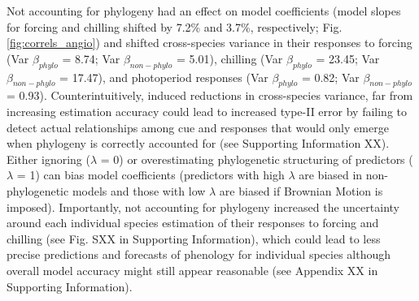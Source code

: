 \documentclass{article}\usepackage[]{graphicx}\usepackage[]{color}
\begin{document}
Not accounting for phylogeny had an effect on model coefficients (model slopes for forcing and chilling shifted by 7.2\% and 3.7\%, respectively; Fig. \ref{fig:correls_angio}) and shifted cross-species variance in their responses to forcing (Var $\beta_{phylo}$ = 8.74; Var $\beta_{non-phylo}$ = 5.01), chilling (Var $\beta_{phylo}$ = 23.45; Var $\beta_{non-phylo}$ = 17.47), and photoperiod responses (Var $\beta_{phylo}$ = 0.82; Var $\beta_{non-phylo}$ = 0.93). Counterintuitively, induced reductions in cross-species variance, far from increasing estimation accuracy could lead to increased type-II error by failing to detect actual relationships among cue and responses that would only emerge when phylogeny is correctly accounted for (see Supporting Information XX). Either ignoring ($\lambda$ = 0) or overestimating phylogenetic structuring of predictors ($\lambda$ = 1) can bias model coefficients (predictors with high $\lambda$ are biased in non-phylogenetic models and those with low $\lambda$ are biased if Brownian Motion is imposed). Importantly, not accounting for phylogeny increased the uncertainty around each individual species estimation of their responses to forcing and chilling (see Fig. SXX in Supporting Information), which could lead to less precise predictions and forecasts of phenology for individual species although overall model accuracy might still appear reasonable (see Appendix XX in Supporting Information).\\

\end{document}
